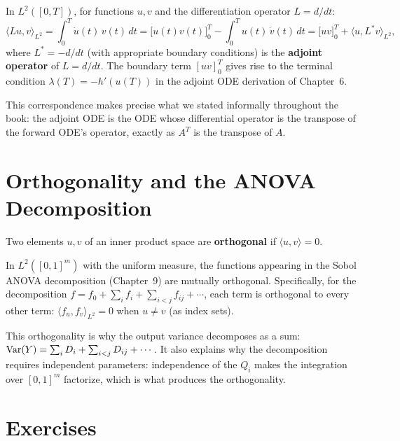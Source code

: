 In $L^2([0,T])$, for functions $u, v$ and the differentiation operator $L = d/dt$:
\[
  \langle Lu, v\rangle_{L^2}
  = \int_0^T \dot{u}(t)\,v(t)\,dt
  = \bigl[u(t)v(t)\bigr]_0^T - \int_0^T u(t)\,\dot{v}(t)\,dt
  = \bigl[uv\bigr]_0^T + \langle u, L^*v\rangle_{L^2},
\]
where $L^* = -d/dt$ (with appropriate boundary conditions) is the
\textbf{adjoint operator} of $L = d/dt$.
The boundary term $[uv]_0^T$ gives rise to the terminal condition
$\lambda(T) = -h'(u(T))$ in the adjoint ODE derivation of Chapter~6.

This correspondence makes precise what we stated informally throughout
the book: the adjoint ODE is the ODE whose differential operator
is the transpose of the forward ODE's operator, exactly as $A^T$
is the transpose of $A$.

\section{Orthogonality and the ANOVA Decomposition}
\label{appsec:ortho}

Two elements $u, v$ of an inner product space are \textbf{orthogonal}
if $\langle u, v\rangle = 0$.

In $L^2([0,1]^m)$ with the uniform measure, the functions appearing in
the Sobol ANOVA decomposition (Chapter~9) are mutually orthogonal.
Specifically, for the decomposition
$f = f_0 + \sum_i f_i + \sum_{i<j} f_{ij} + \cdots$,
each term is orthogonal to every other term:
$\langle f_{u}, f_{v}\rangle_{L^2} = 0$ when $u \neq v$ (as index sets).

This orthogonality is why the output variance decomposes as a sum:
$\operatorname{Var}(Y) = \sum_i D_i + \sum_{i<j} D_{ij} + \cdots$.
It also explains why the decomposition requires independent parameters:
independence of the $Q_i$ makes the integration over $[0,1]^m$ factorize,
which is what produces the orthogonality.

\section{Exercises}
\label{appsec:A_exercises}

